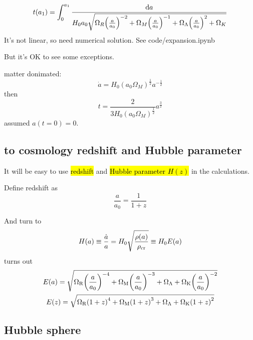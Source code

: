 \begin{equation}
    t(a_1) = \int_{0}^{a_1}  \frac{\dd a}{H_0 a_0 \sqrt{\Omega_R {\qty(\frac{a}{a_0})}^{-2} + \Omega_M {\qty(\frac{a}{a_0})}^{-1} + \Omega_\Lambda {\qty(\frac{a}{a_0})}^{2} + \Omega_K}} 
\end{equation}
It's not linear, so need numerical solution. See code/expansion.ipynb

But it's OK to see some  exceptions.
\begin{block}
    matter donimated:
    \begin{equation}
        \dot{a} = H_0 {(a_0 \Omega_M)}^{\frac{1}{2}}  a^{-\frac{1}{2}} 
    \end{equation}
    then 
    \begin{equation}
        t = \frac{2}{3 H_0 {(a_0 \Omega_M)}^{\frac{1}{2}} } a^{\frac{3}{2}} 
    \end{equation}
    assumed $a(t=0)=0$.
\end{block}

\subsection{to cosmology redshift and Hubble parameter}

It will be easy to use \hl{redshift} and \hl{Hubble parameter $H(z)$} in the calculations.

Define redshift as
\begin{equation}
    \frac{a}{a_0} = \frac{1}{1+z}
\end{equation}

And turn  to 
\begin{equation}
    H(a) \equiv \frac{\dot{a}}{a} = H_0 \sqrt{\frac{\rho(a)}{\rho_{\mathrm{cr}}}} \equiv H_0 E(a)
\end{equation}
 turns out 
\begin{gather}
    E(a) = \sqrt{\Omega_{\mathrm{R}} {\qty(\frac{a}{a_0})}^{-4} + \Omega_{\mathrm{M}} {\qty(\frac{a}{a_0})}^{-3} + \Omega_\Lambda + \Omega_{\mathrm{K}} {\qty(\frac{a}{a_0})}^{-2}} \\ 
    E(z) = \sqrt{\Omega_{\mathrm{R}} {\qty(1+z)}^{4} + \Omega_{\mathrm{M}} {\qty(1+z)}^{3} + \Omega_\Lambda + \Omega_{\mathrm{K}} {\qty(1+z)}^{2}} 
\end{gather}

\subsection{Hubble sphere}

